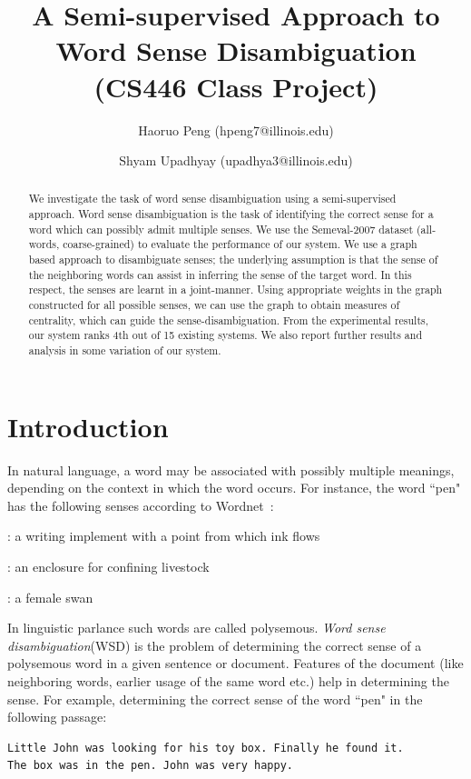 \documentclass[12pt,letterpaper]{article}
\begin{document}
\title{A Semi-supervised Approach to Word Sense Disambiguation \\ \Large{(CS446 Class Project)}}
\author{Haoruo Peng (hpeng7@illinois.edu) \and Shyam Upadhyay (upadhya3@illinois.edu)}
\maketitle
\begin{abstract}
We investigate the task of word sense disambiguation using a semi-supervised approach. Word sense disambiguation is the task of identifying the correct sense for a word which can possibly admit multiple senses. We use the Semeval-2007 dataset (all-words, coarse-grained) to evaluate the performance of our system. We use a graph based approach to disambiguate senses; the underlying assumption is that the sense of the neighboring words can assist in inferring the sense of the target word. In this respect, the senses are learnt in a joint-manner. Using appropriate weights in the graph constructed for all possible senses, we can use the graph to obtain measures of centrality, which can guide the sense-disambiguation. From the experimental results, our system ranks 4th out of 15 existing systems. We also report further results and analysis in some variation of our system.
\end{abstract}


\section{Introduction} 
\label{sec:introduction}
In natural language, a word may be associated with possibly multiple meanings, depending on the context in which the word occurs. For instance, the word ``pen" has the following senses according to Wordnet~\cite{wordnet}:
\begin{description}
\setlength{\itemsep}{1pt}
\setlength{\parskip}{0pt}
\setlength{\parsep}{0pt}
\item [pen] : a writing implement with a point from which ink flows
\item [pen] : an enclosure for confining livestock
\item [pen] : a female swan
\end{description}

In linguistic parlance such words are called polysemous. \emph{Word sense disambiguation}(WSD) is the problem of determining the correct sense of a polysemous word in a given sentence or document. Features of the document (like neighboring words, earlier usage of the same word etc.) help in determining the sense. For example, determining the correct sense of the word ``pen" in the following passage:
\begin{verbatim}
Little John was looking for his toy box. Finally he found it. 
The box was in the pen. John was very happy.
\end{verbatim}
\end{document}
